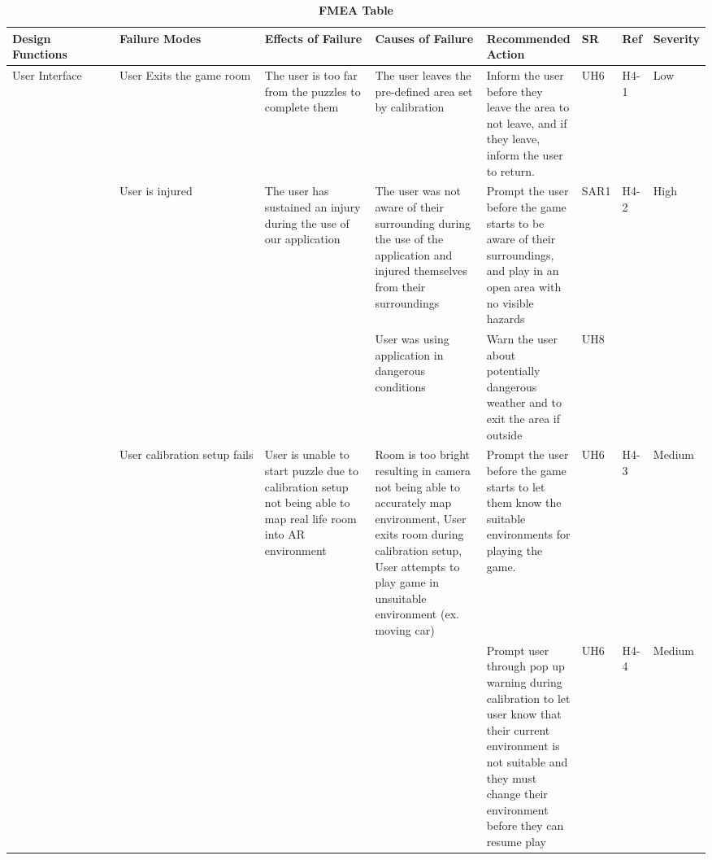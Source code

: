 \documentclass{article}
\begin{document}
\begin{table}[H]
    \begin{adjustbox}{width=(/5)}
    \centering
    

    \begin{tabular}{|p{0.20\linewidth} | p{0.30\linewidth} | p{0.20\linewidth}|  p{0.20\linewidth}|  p{0.30\linewidth}|  p{0.07\linewidth}|  p{0.07\linewidth}|p{0.12\linewidth}| }
    \hline
         \textbf{Design Functions} & \textbf{Failure Modes} & \textbf{Effects of Failure} & \textbf{Causes of Failure} & \textbf{Recommended Action} & \textbf{SR} & \textbf{Ref} & \textbf{Severity}\\
         \hline
          User Interface                   &           User Exits the game room             &           The user is too far from the puzzles to complete them           &                The user leaves the pre-defined area set by calibration            &           Inform the user before they leave the area to not leave, and if they leave, inform the user to return.                  &   UH6          &   H4-1           &   Low               \\
            &    User is injured     &    The user has sustained an injury during the use of our application      &  The user was not aware of their surrounding during the use of the application and injured themselves from their surroundings \newline                 &    Prompt the user before the game starts to be aware of their surroundings, and play in an open area with no visible hazards    &  SAR1           &   H4-2     & High\\&&& User was using application in dangerous conditions \newline & Warn the user about potentially dangerous weather and to exit the area if outside&   UH8   &  &                \\
                                   &    User calibration setup fails   &   User is unable to start puzzle due to calibration setup not being able to map real life room into AR environment & Room is too bright resulting in camera not being able to accurately map environment, User exits room during calibration setup, User attempts to play game in unsuitable environment (ex. moving car) & Prompt the user before the game starts to let them know the suitable environments for playing the game. &UH6&H4-3& Medium\\&&&& Prompt user through pop up warning during calibration to let user know that their current environment is not suitable and they must change their environment before they can resume play   & UH6   & H4-4 & Medium   \\
          \hline
    \end{tabular}
    \end{adjustbox}
    \caption{\bf FMEA Table}
    \label{tab:FMEA2}
\end{table}
\end{document}
